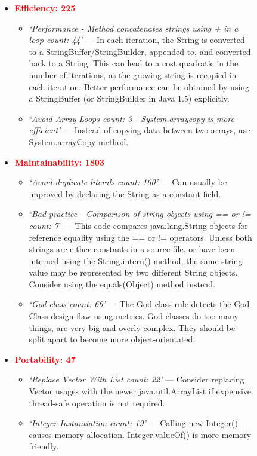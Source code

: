 \begin{figure}[tbp]
\begin{framed}
\begin{itemize}
    \item \textcolor{red}{\textbf{Efficiency: 225}}
    \begin{itemize}
        \item \textit{`Performance -  Method concatenates strings using + in a loop count: 44'} --- In each iteration, the String is converted to a StringBuffer/StringBuilder, appended to, and converted back to a String. This can lead to a cost quadratic in the number of iterations, as the growing string is recopied in each iteration. Better performance can be obtained by using a StringBuffer (or StringBuilder in Java 1.5) explicitly.
        \item \textit{`Avoid Array Loops count: 3 - System.arraycopy is more efficient'} --- Instead of copying data between two arrays, use System.arrayCopy method.
    \end{itemize}

    \item \textcolor{red}{\textbf{Maintainability: 1803}}
    \begin{itemize}
        \item \textit{`Avoid duplicate literals count: 160'} --- Can usually be improved by declaring the String as a constant field.
        \item \textit{`Bad practice - Comparison of string objects using == or != count: 7'} --- This code compares java.lang.String objects for reference equality using the == or != operators. Unless both strings are either constants in a source file, or have been interned using the String.intern() method, the same string value may be represented by two different String objects. Consider using the equals(Object) method instead.
        \item \textit{`God class count: 66'} --- The God class rule detects the God Class design flaw using metrics. God classes do too many things, are very big and overly complex. They should be split apart to become more object-orientated. 
    \end{itemize}
      
     \item \textcolor{red}{\textbf{Portability: 47}} 
    \begin{itemize}
        \item \textit{`Replace Vector With List count: 22'} ---
            Consider replacing Vector usages with the newer 
        java.util.ArrayList if expensive thread-safe operation is not required.
        \item \textit{`Integer Instantiation count: 19'} --- Calling new Integer() causes memory allocation. Integer.valueOf() is more memory friendly.
    \end{itemize}
    

\end{itemize}
\end{framed}
\end{figure}
